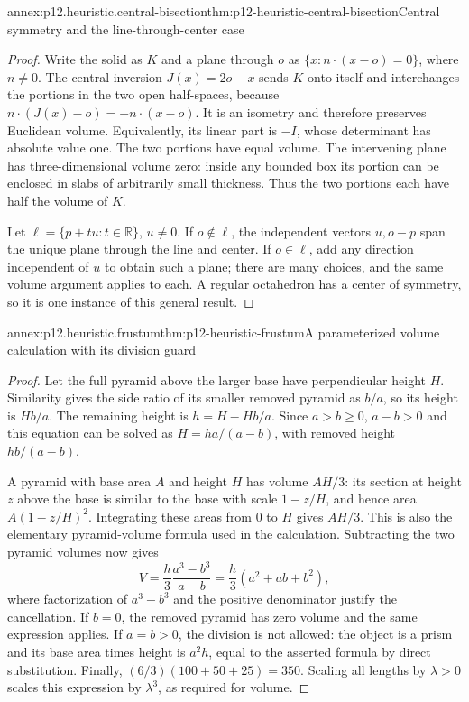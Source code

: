 \begin{annexitem}{annex:p12.heuristic.central-bisection}{thm:p12-heuristic-central-bisection}{Central symmetry and the line-through-center case}
\begin{proof}
Write the solid as \(K\) and a plane through \(o\) as
\(\{x:n\cdot(x-o)=0\}\), where \(n\ne0\).
The central inversion \(J(x)=2o-x\) sends \(K\) onto itself
and interchanges the portions in the two open half-spaces,
because \(n\cdot(J(x)-o)=-n\cdot(x-o)\).
It is an isometry and therefore preserves Euclidean volume.
Equivalently, its linear part is \(-I\), whose determinant
has absolute value one. The two portions have equal volume.
The intervening plane has three-dimensional volume zero:
inside any bounded box its portion can be enclosed in slabs
of arbitrarily small thickness. Thus the two portions each
have half the volume of \(K\).

Let \(\ell=\{p+tu:t\in\mathbb R\}\), \(u\ne0\).
If \(o\notin\ell\), the independent vectors \(u,o-p\)
span the unique plane through the line and center. If
\(o\in\ell\), add any direction independent of \(u\)
to obtain such a plane; there are many choices, and the same
volume argument applies to each. A regular octahedron has a
center of symmetry, so it is one instance of this general result.
\end{proof}
\end{annexitem}

\begin{annexitem}{annex:p12.heuristic.frustum}{thm:p12-heuristic-frustum}{A parameterized volume calculation with its division guard}
\begin{proof}
Let the full pyramid above the larger base have perpendicular
height \(H\). Similarity gives the side ratio of its smaller
removed pyramid as \(b/a\), so its height is \(Hb/a\).
The remaining height is \(h=H-Hb/a\). Since \(a>b\ge0\),
\(a-b>0\) and this equation can be solved as
\(H=ha/(a-b)\), with removed height \(hb/(a-b)\).

A pyramid with base area \(A\) and height \(H\) has volume
\(AH/3\): its section at height \(z\) above the base is
similar to the base with scale \(1-z/H\), and hence area
\(A(1-z/H)^2\). Integrating these areas from \(0\) to \(H\)
gives \(AH/3\). This is also the elementary pyramid-volume
formula used in the calculation. Subtracting the two pyramid
volumes now gives
\[
 V=\frac h3\frac{a^3-b^3}{a-b}
  =\frac h3(a^2+ab+b^2),
\]
where factorization of \(a^3-b^3\) and the positive denominator
justify the cancellation. If \(b=0\), the removed pyramid has
zero volume and the same expression applies. If \(a=b>0\), the
division is not allowed: the object is a prism and its base
area times height is \(a^2h\), equal to the asserted formula
by direct substitution. Finally, \((6/3)(100+50+25)=350\).
Scaling all lengths by \(\lambda>0\) scales this expression
by \(\lambda^3\), as required for volume.
\end{proof}
\end{annexitem}

